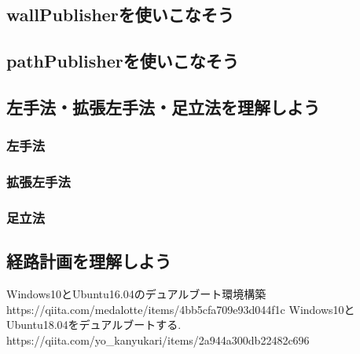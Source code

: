 \documentclass[11pt,a4paper]{jsarticle}
\begin{document}
\newpage
\subsection{wallPublisherを使いこなそう}




\newpage
\subsection{pathPublisherを使いこなそう}




\newpage
\subsection{左手法・拡張左手法・足立法を理解しよう}
\subsubsection{左手法}



\newpage
\subsubsection{拡張左手法}



\subsubsection{足立法}





\newpage
\subsection{経路計画を理解しよう}



%


\begin{thebibliography}{99}
 Windows10とUbuntu16.04のデュアルブート環境構築\\https://qiita.com/medalotte/items/4bb5cfa709e93d044f1c
 Windows10とUbuntu18.04をデュアルブートする.\\https://qiita.com/yo\_kanyukari/items/2a944a300db22482c696
\end{thebibliography}%
%
\end{document}
